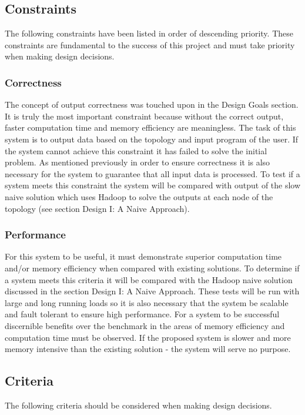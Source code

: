 \documentclass[a4paper]{article}
\begin{document}
\subsection{Constraints}
The following constraints have been listed in order of descending priority.  These constraints are fundamental to the success of this project and must take priority when making design decisions.  

\subsubsection{Correctness}
The concept of output correctness was touched upon in the Design Goals section.  It is truly the most important constraint because without the correct output, faster computation time and memory efficiency are meaningless.  The task of this system is to output data based on the topology and input program of the user.  If the system cannot achieve this constraint it has failed to solve the initial problem.  As mentioned previously in order to ensure correctness it is also necessary for the system to guarantee that all input data is processed.  To test if a system meets this constraint the system will be compared with output of the slow naive solution which uses Hadoop to solve the outputs at each node of the topology (see section Design I: A Naive Approach).

\subsubsection{Performance}
For this system to be useful, it must demonstrate superior computation time and/or memory efficiency when compared with existing solutions.  To determine if a system meets this criteria it will be compared with the Hadoop naive solution discussed in the section Design I: A Naive Approach.  These tests will be run with large and long running loads so it is also necessary that the system be scalable and fault tolerant to ensure high performance.  For a system to be successful discernible benefits over the benchmark in the areas of memory efficiency and computation time must be observed.  If the proposed system is slower and more memory intensive than the existing solution - the system will serve no purpose.  

\subsection{Criteria}
The following criteria should be considered when making design decisions.
\end{document}
